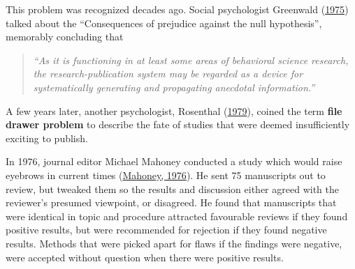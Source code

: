\documentclass{krantz}
\begin{document}
This problem was recognized decades ago. Social psychologist Greenwald (\protect\hyperlink{ref-greenwald1975}{1975}) talked about the ``Consequences of prejudice against the null hypothesis'', memorably concluding that

\begin{quote}
\emph{``As it is functioning in at least some areas of behavioral science research, the research-publication system may be regarded as a device for systematically generating and propagating anecdotal information.''}
\end{quote}

A few years later, another psychologist, Rosenthal (\protect\hyperlink{ref-rosenthal1979}{1979}), coined the term \textbf{file drawer problem} to describe the fate of studies that were deemed insufficiently exciting to publish.

In 1976, journal editor Michael Mahoney conducted a study which would raise eyebrows in current times (\protect\hyperlink{ref-mahoney1976}{Mahoney, 1976}). He sent 75 manuscripts out to review, but tweaked them so the results and discussion either agreed with the reviewer's presumed viewpoint, or disagreed. He found that manuscripts that were identical in topic and procedure attracted favourable reviews if they found positive results, but were recommended for rejection if they found negative results. Methods that were picked apart for flaws if the findings were negative, were accepted without question when there were positive results.
\end{document}
